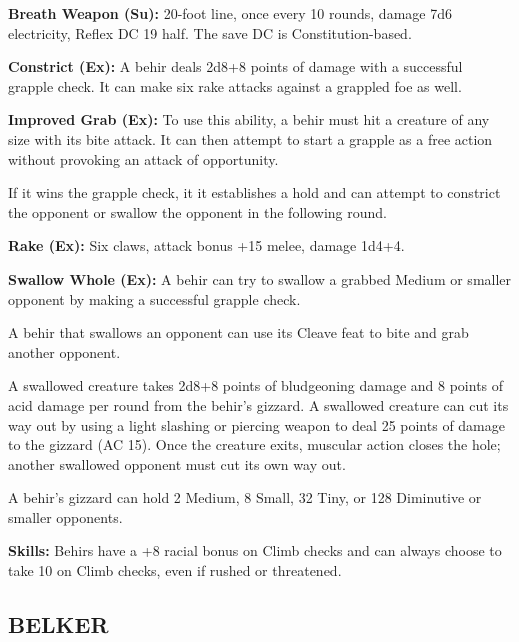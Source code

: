 \documentclass{article}
\begin{document}
\textbf{Breath Weapon (Su):} 20-foot line, once every 10 rounds, damage 7d6 electricity, 
Reflex DC 19 half. The save DC is Constitution-based.

\textbf{Constrict (Ex):} A behir deals 2d8+8 points of damage with a successful 
grapple check. It can make six rake attacks against a grappled foe as well.

\textbf{Improved Grab (Ex):} To use this ability, a behir must hit a creature of 
any size with its bite attack. It can then attempt to start a grapple as a free 
action without provoking an attack of opportunity.

If it wins the grapple check, it it establishes a hold and can attempt to constrict 
the opponent or swallow the opponent in the following round.

\textbf{Rake (Ex):} Six claws, attack bonus +15 melee, damage 1d4+4.

\textbf{Swallow Whole (Ex): }A behir can try to swallow a grabbed Medium or smaller 
opponent by making a successful grapple check.

A behir that swallows an opponent can use its Cleave feat to bite and grab another 
opponent.

A swallowed creature takes 2d8+8 points of bludgeoning damage and 8 points of acid 
damage per round from the behir's gizzard. A swallowed creature can cut its way 
out by using a light slashing or piercing weapon to deal 25 points of damage to 
the gizzard (AC 15). Once the creature exits, muscular action closes the hole; 
another swallowed opponent must cut its own way out.

A behir's gizzard can hold 2 Medium, 8 Small, 32 Tiny, or 128 Diminutive or smaller 
opponents.

\textbf{Skills: }Behirs have a +8 racial bonus on Climb checks and can always choose 
to take 10 on Climb checks, even if rushed or threatened.

\vspace{12pt}
\subsection*{{\LARGE{}BELKER}}
\end{document}
